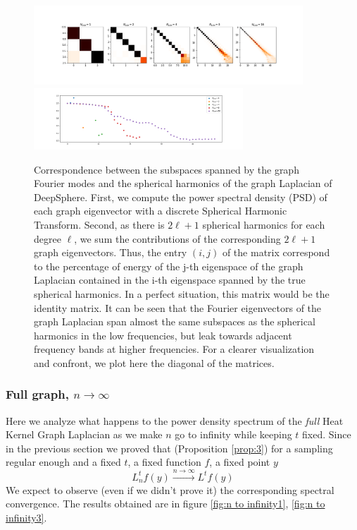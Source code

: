 \begin{figure}[h!]
	\label{fig:deepsphere results}
	
	\centering
	\includegraphics[width=0.9\textwidth]{../codes/02.HeatKernelGraphLaplacian/HEALPix/06_figures/deepsphere_original.png}
		\includegraphics[width=0.7\textwidth]{../codes/02.HeatKernelGraphLaplacian/HEALPix/06_figures/deepsphere_original_diagonal.png}	
		\caption{Correspondence between the subspaces spanned by the graph Fourier modes and the spherical harmonics of the graph Laplacian of DeepSphere. First, we compute the power spectral density (PSD) of each graph eigenvector with a discrete Spherical Harmonic Transform. Second, as there is $2\ell + 1$ spherical harmonics for each degree $\ell$, we sum the contributions of the corresponding $2\ell + 1$ graph eigenvectors. Thus, the entry $(i, j)$ of the matrix correspond to the percentage of energy of the j-th eigenspace of the graph Laplacian contained in the i-th eigenspace spanned by the true spherical harmonics. In a perfect situation, this matrix would be the identity matrix.
			It can be seen that the Fourier eigenvectors of the graph Laplacian span almost the same subspaces as the spherical harmonics in the low frequencies, but leak towards adjacent frequency bands at higher frequencies. 	For a clearer visualization and confront, we plot here the diagonal of the matrices.}
\end{figure}

\subsubsection{Full graph, $n\to\infty$}\label{sec:Chapter1: n to infty}
Here we analyze what happens to the power density spectrum of the \textit{full} Heat Kernel Graph Laplacian as we make $n$ go to infinity while keeping $t$ fixed. Since in the previous section we proved that (Proposition \ref{prop:3}) for a sampling regular enough and a fixed $t$, a fixed function $f$, a fixed point $y$
$$L_n^tf(y)\xrightarrow{n\to\infty}L^tf(y)$$
We expect to observe (even if we didn't prove it) the corresponding spectral convergence. The results obtained are in figure \ref{fig:n to infinity1}, \ref{fig:n to infinity3}.

